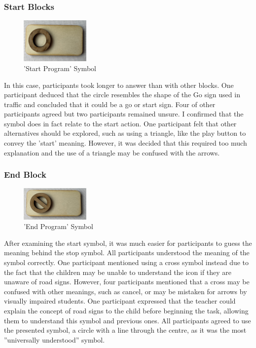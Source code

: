\documentclass[oneside,%
                    author={Malak Hajji},
                    degree={BSc},
                    title={Designing An Accessible Computational Toolkit For Students},
                  subtitle={With Mixed Visual Abilities}]{dissertation}
\begin{document}
\subsubsection{Start Blocks}
\FloatBarrier
\begin{figure}[h]
    \centering
    \includegraphics[width=0.3\textwidth]{thesis/start.eps}
    \caption{'Start Program' Symbol}
    \label{fig-start-initial}
\end{figure}
\FloatBarrier
In this case, participants took longer to answer than with other blocks. One participant deduced that the circle resembles the shape of the Go sign used in traffic and concluded that it could be a go or start sign. Four of other participants agreed but two participants remained unsure.  I confirmed that the symbol does in fact relate to the start action. One participant felt that other alternatives should be explored, such as using a triangle, like the play button to convey the 'start' meaning. However, it was decided that this required too much explanation and the use of a triangle may be confused with the arrows.

\subsubsection{End Block}

\FloatBarrier
\begin{figure}[h]
    \centering
    \includegraphics[width=0.3\textwidth]{thesis/end.eps}
    \caption{'End Program' Symbol}
    \label{fig-end-initial}
\end{figure}
\FloatBarrier
After examining the start symbol, it was much easier for participants to guess the meaning behind the stop symbol. All participants understood the meaning of the symbol correctly. One participant mentioned using a cross symbol instead due to the fact that the children may be unable to understand the icon if they are unaware of road signs. However, four participants mentioned that a cross may be confused with other meanings, such as cancel, or may be mistaken for arrows by visually impaired students. One participant expressed that the teacher could explain the concept of road signs to the child before beginning the task, allowing them to understand this symbol and previous ones. All participants agreed to use the presented symbol, a circle with a line through the centre, as it was the most ”universally understood” symbol. 
\end{document}
